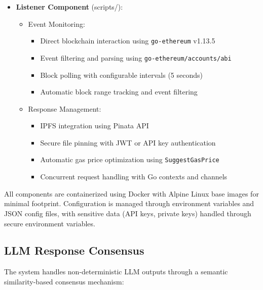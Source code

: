 \documentclass[12pt]{article}
\begin{document}
\begin{itemize}
    \item \textbf{Listener Component} (scripts/):
    \begin{itemize}
        \item Event Monitoring:
        \begin{itemize}
            \item Direct blockchain interaction using \texttt{go-ethereum} v1.13.5
            \item Event filtering and parsing using \texttt{go-ethereum/accounts/abi}
            \item Block polling with configurable intervals (5 seconds)
            \item Automatic block range tracking and event filtering
        \end{itemize}
        \item Response Management:
        \begin{itemize}
            \item IPFS integration using Pinata API
            \item Secure file pinning with JWT or API key authentication
            \item Automatic gas price optimization using \texttt{SuggestGasPrice}
            \item Concurrent request handling with Go contexts and channels
        \end{itemize}
    \end{itemize}
\end{itemize}

All components are containerized using Docker with Alpine Linux base images for minimal footprint. Configuration is managed through environment variables and JSON config files, with sensitive data (API keys, private keys) handled through secure environment variables.

\subsection{LLM Response Consensus}
The system handles non-deterministic LLM outputs through a semantic similarity-based consensus mechanism:
\end{document}
